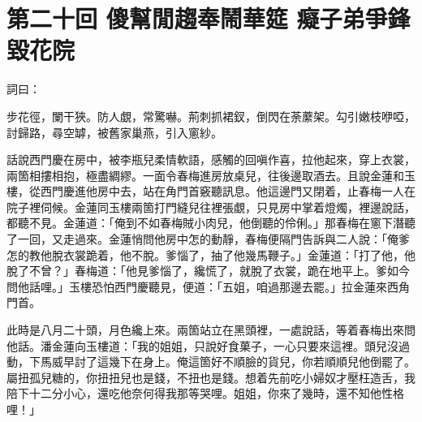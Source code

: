 
\chapter*{第二十回 傻幫閒趨奉鬧華筵 癡子弟爭鋒毀花院}


詞曰：

\begin{myquote} 
步花徑，闌干狹。防人覷，常驚嚇。荊刺抓裙釵，倒閃在荼䕷架。勾引嫩枝咿啞，討歸路，尋空罅，被舊家巢燕，引入窻紗。

\end{myquote} 

話說西門慶在房中，被李瓶兒柔情軟語，{}感觸的回嗔作喜，拉他起來，穿上衣裳，兩箇相摟相抱，極盡綢繆。一面令春梅進房放桌兒，往後邊取酒去。且說金蓮和玉樓，從西門慶進他房中去，站在角門首竅聽訊息。他這邊門又閉着，止春梅一人在院子裡伺候。金蓮同玉樓兩箇打門縫兒往裡張覷，只見房中掌着燈燭，裡邊說話，都聽不見。金蓮道：「俺到不如春梅賊小肉兒，他倒聽的伶俐。」那春梅在窻下潛聽了一回，又走過來。金蓮悄問他房中怎的動靜，春梅便隔門告訴與二人說：「俺爹怎的教他脫衣裳跪着，他不脫。爹惱了，抽了他幾馬鞭子。」金蓮道：「打了他，他脫了不曾？」春梅道：「他見爹惱了，纔慌了，就脫了衣裳，跪在地平上。爹如今問他話哩。」玉樓恐怕西門慶聽見，便道：「五姐，咱過那邊去罷。」{}拉金蓮來西角門首。

此時是八月二十頭，月色纔上來。兩箇站立在黑頭裡，一處說話，等着春梅出來問他話。潘金蓮向玉樓道：「我的姐姐，只說好食菓子，一心只要來這裡。頭兒沒過動，下馬威早討了這幾下在身上。俺這箇好不順臉的貨兒，你若順順兒他倒罷了。屬扭孤兒糖的，你扭扭兒也是錢，不扭也是錢。想着先前吃小婦奴才壓枉造舌，我陪下十二分小心，還吃他奈何得我那等哭哩。姐姐，你來了幾時，還不知他性格哩！」

